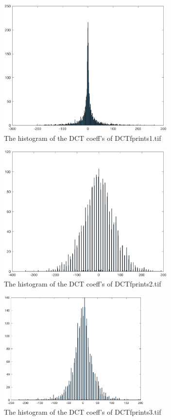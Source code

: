 \documentclass{article}
\begin{document}
\begin{figure}[H]
\centering
\includegraphics [width=3.5in]{lab5_01.eps}
\caption{The histogram of the DCT coeff's of DCTfprints1.tif}
\label{DCT1}
\end{figure}

\begin{figure}[H]
\centering
\includegraphics [width=3.5in]{lab5_02.eps}
\caption{The histogram of the DCT coeff's of DCTfprints2.tif}
\label{DCT2}
\end{figure}

\begin{figure}[H]
\centering
\includegraphics [width=3in]{lab5_03.eps}
\caption{The histogram of the DCT coeff's of DCTfprints3.tif}
\label{DCT3}
\end{figure}
\end{document}
